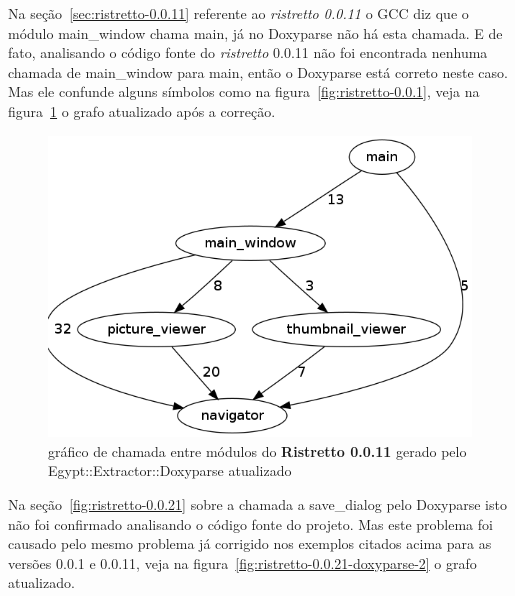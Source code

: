 Na seção~\ref{sec:ristretto-0.0.11} referente ao {\it ristretto 0.0.11} o GCC diz que o módulo main\_window chama
main, já no Doxyparse não há esta chamada. E de fato, analisando o código fonte
do {\it ristretto} 0.0.11 não foi encontrada nenhuma chamada de main\_window para
main, então o Doxyparse está correto neste caso. Mas ele confunde alguns
símbolos como na figura~\ref{fig:ristretto-0.0.1}, veja na
figura~\ref{fig:ristretto-0.0.11-doxyparse-2} o grafo atualizado após a correção.

\begin{figure}
\center
\includegraphics[scale=0.3]{imagens/ristretto-0_0_11-doxyparse-2}
\caption{gráfico de chamada entre módulos do {\bf Ristretto 0.0.11} gerado pelo Egypt::Extractor::Doxyparse atualizado}
\label{fig:ristretto-0.0.11-doxyparse-2}
\end{figure}

Na seção~\ref{fig:ristretto-0.0.21} sobre a chamada a save\_dialog pelo Doxyparse isto não foi confirmado analisando o código fonte do projeto.
Mas este problema foi causado pelo mesmo problema já corrigido nos exemplos
citados acima para as versões 0.0.1 e 0.0.11, veja na
figura~\ref{fig:ristretto-0.0.21-doxyparse-2} o grafo atualizado.

